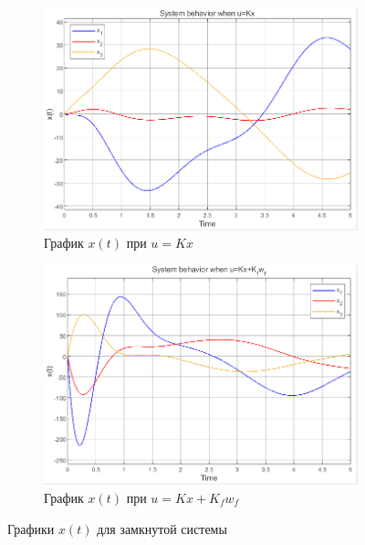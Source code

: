 \documentclass[a4paper, 12pt]{article}
\begin{document}
    \begin{figure}[H]
        \centering
        \begin{subfigure}{0.45\textwidth}
            \centering
            \includegraphics[width=\linewidth]{1task_x_kx.png}
            \caption{График $x(t)$ при $u=Kx$}
            \label{fig:1task_x_kx}
        \end{subfigure}
        \hspace{5mm}
        \begin{subfigure}{0.45\textwidth}
            \centering
            \includegraphics[width=\linewidth]{1task_x_kxkf.png}
            \caption{График $x(t)$ при $u=Kx+K_fw_f$}
            \label{fig:1task_x_kxkf}
        \end{subfigure}
        \caption{Графики $x(t)$ для замкнутой системы}
        \label{fig:1task_x_kx_kxkf}
    \end{figure}
\end{document}
